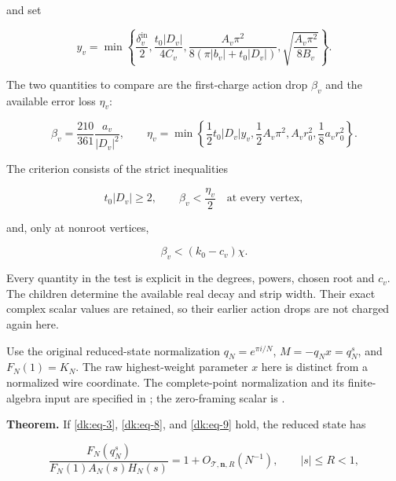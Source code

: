 and set

\begin{equation}\label{dk:eq-6}
y_v=\min\left\{
 \frac{\delta_v^{\mathrm{in}}}2,
 \frac{t_0|D_v|}{4C_v},
 \frac{A_v\pi^2}{8(\pi|b_v|+t_0|D_v|)},
 \sqrt{\frac{A_v\pi^2}{8B_v}}
 \right\}.
\end{equation}

The two quantities to compare are the first-charge action drop
$\beta_v$ and the available error loss $\eta_v$:

\begin{equation}\label{dk:eq-7}
\beta_v=\frac{210}{361}\frac{a_v}{|D_v|^2},
 \qquad
 \eta_v=\min\left\{
 \frac12t_0|D_v|y_v,
 \frac12A_v\pi^2,
 A_vr_0^2,
 \frac18a_vr_0^2
 \right\}.
\end{equation}

The criterion consists of the strict inequalities

\begin{equation}\label{dk:eq-8}
\boxed{\quad t_0|D_v|\ge2,\qquad
                 \beta_v<\frac{\eta_v}{2}\quad
                      \text{at every vertex},\quad}
\end{equation}

and, only at nonroot vertices,

\begin{equation}\label{dk:eq-9}
\boxed{\qquad
       \beta_v<(k_0-c_v)\chi.\qquad}
\end{equation}

Every quantity in the test is explicit in the degrees, powers, chosen
root and $c_v$. The children determine the available real decay and
strip width. Their exact complex scalar values are retained, so their
earlier action drops are not charged again here.

Use the original reduced-state normalization
\(q_N=e^{\pi i/N}\), \(M=-q_Nx=q_N^s\), and \(F_N(1)=K_N\).
The raw highest-weight parameter \(x\) here is distinct from a normalized
wire coordinate. The complete-point normalization and its finite-algebra input are
specified in \cite[Section~2]{MeridianTangles}; the zero-framing
scalar is \cite[Proposition~8.1]{MeridianTangles}.

\textbf{Theorem.} If \eqref{dk:eq-3}, \eqref{dk:eq-8}, and \eqref{dk:eq-9} hold, the reduced state has

\begin{equation}\label{dk:eq-10}
\frac{F_N(q_N^s)}{F_N(1)A_N(s)H_N(s)}
                  =1+O_{\mathcal T,\mathbf n,R}(N^{-1}),
             \qquad |s|\le R<1,
\end{equation}

